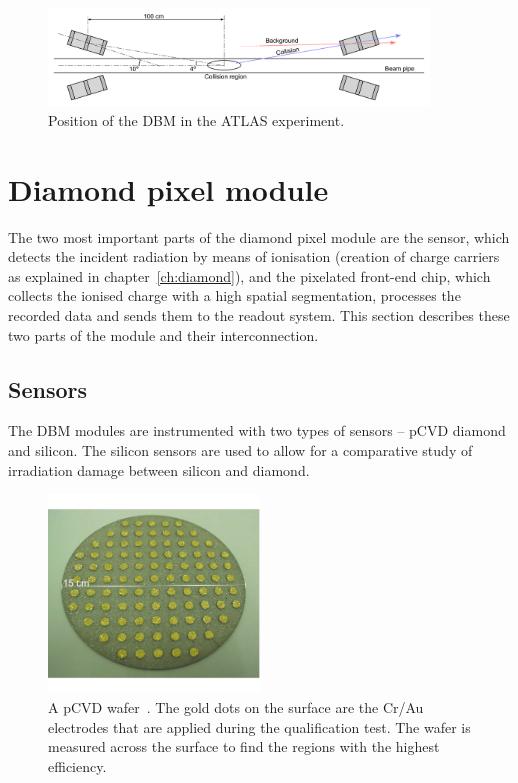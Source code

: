 \begin{figure}[!t]
\centering
\includegraphics[width=0.9\textwidth]{04_charge_monitoring/pics/positioning}
\caption{Position of the DBM in the ATLAS experiment.}
\label{fig:dbminatlas2}
\end{figure}



\section{Diamond pixel module}
\label{sec:atlasdbm}
The two most important parts of the diamond pixel module are the sensor, which detects the incident radiation by means of ionisation (creation of charge carriers as explained in chapter~\ref{ch:diamond}), and the pixelated front-end chip, which collects the ionised charge with a high spatial segmentation, processes the recorded data and sends them to the readout system. This section describes these two parts of the module and their interconnection.

\subsection{Sensors}
The DBM modules are instrumented with two types of sensors -- pCVD diamond and silicon. The silicon sensors are used to allow for a comparative study of irradiation damage between silicon and diamond.
\begin{figure}[!t]
\centering
\includegraphics[width=0.5\textwidth]{04_charge_monitoring/pics/wafer-copy}
\caption{A pCVD wafer~\cite{RADSEN:00001}. The gold dots on the surface are the Cr/Au electrodes that are applied during the qualification test. The wafer is measured across the surface to find the regions with the highest efficiency.}
\label{fig:wafer}
\end{figure}

